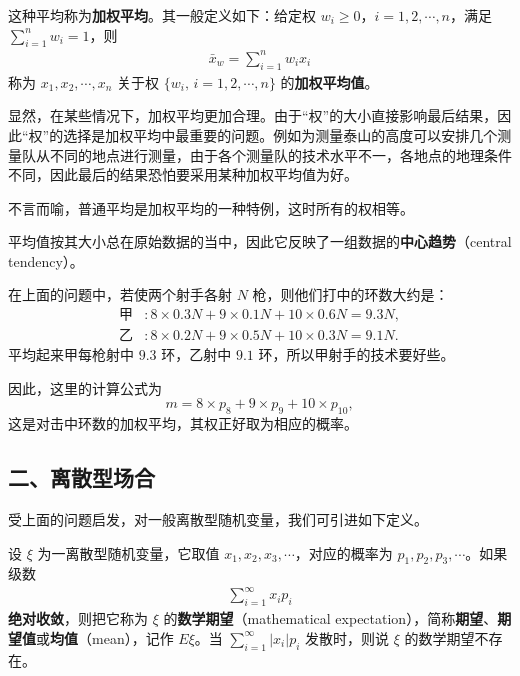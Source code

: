 \documentclass[../../main.tex]{subfiles}
\begin{document}
这种平均称为\textbf{加权平均}。其一般定义如下：给定权 $w_i\geqslant 0$，$i=1,2,\cdots,n$，满足 $\sum_{i=1}^n w_i=1$，则
\begin{align}
\bar{x}_w=\sum_{i=1}^n w_i x_i\label{align:ch04-加权平均}
\end{align}
称为 $x_1,x_2,\cdots,x_n$ 关于权 $\{w_i,\,i=1,2,\cdots,n\}$ 的\textbf{加权平均值}。

显然，在某些情况下，加权平均更加合理。由于``权''的大小直接影响最后结果，因此``权''的选择是加权平均中最重要的问题。例如为测量泰山的高度可以安排几个测量队从不同的地点进行测量，由于各个测量队的技术水平不一，各地点的地理条件不同，因此最后的结果恐怕要采用某种加权平均值为好。

不言而喻，普通平均是加权平均的一种特例，这时所有的权相等。

平均值按其大小总在原始数据的当中，因此它反映了一组数据的\textbf{中心趋势}（central tendency）。

在上面的问题中，若使两个射手各射 $N$ 枪，则他们打中的环数大约是：
\begin{align*}
\text{甲}&:8\times 0.3N+9\times 0.1N+10\times 0.6N=9.3N,\\
\text{乙}&:8\times 0.2N+9\times 0.5N+10\times 0.3N=9.1N.
\end{align*}
平均起来甲每枪射中 $9.3$ 环，乙射中 $9.1$ 环，所以甲射手的技术要好些。

因此，这里的计算公式为
\[
m=8\times p_8+9\times p_9+10\times p_{10},
\]
这是对击中环数的加权平均，其权正好取为相应的概率。

\subsection*{二、离散型场合}

受上面的问题启发，对一般离散型随机变量，我们可引进如下定义。

\begin{definition}[离散型随机变量的数学期望]\label{definition:ch04-离散型期望}
设 $\xi$ 为一离散型随机变量，它取值 $x_1,x_2,x_3,\cdots$，对应的概率为 $p_1,p_2,p_3,\cdots$。如果级数
\begin{align}
\sum_{i=1}^{\infty} x_i p_i\label{align:ch04-离散期望级数}
\end{align}
\textbf{绝对收敛}，则把它称为 $\xi$ 的\textbf{数学期望}（mathematical expectation），简称\textbf{期望}、\textbf{期望值}或\textbf{均值}（mean），记作 $E\xi$。当 $\sum_{i=1}^{\infty}|x_i|p_i$ 发散时，则说 $\xi$ 的数学期望不存在。
\end{definition}
\end{document}
